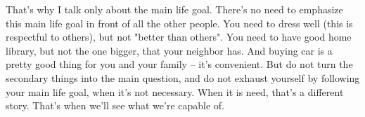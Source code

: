 That's why I talk only about the main life goal. There's no need to emphasize this main life goal in front of all the other people. You need to dress well (this is respectful to others), but not "better than others". You need to have good home library, but not the one bigger, that your neighbor has. And buying car is a pretty good thing for you and your family -- it's convenient. But do not turn the secondary things into the main question, and do not exhaust yourself by following your main life goal, when it's not necessary. When it is need, that's a different story. That's when we'll see what we're capable of.